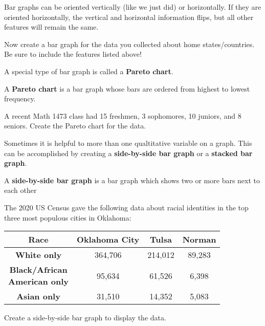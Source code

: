 \documentclass[notes]{subfiles}
\begin{document}
		\begin{rmk}[Note]
			Bar graphs can be oriented vertically (like we just did) or horizontally.  If they are oriented horizontally, the vertical and horizontal information flips, but all other features will remain the same.
		\end{rmk}

		\begin{ex}
			Now create a bar graph for the data you collected about home states/countries.  Be sure to include the features listed above!
		\end{ex}
			\newpage
		A special type of bar graph is called a \textbf{Pareto chart}.

		\begin{defn}
			A \textbf{Pareto chart} is a bar graph whose bars are ordered from highest to lowest frequency.
		\end{defn}

		\begin{ex}
			A recent Math 1473 class had 15 freshmen, 3 sophomores, 10 juniors, and 8 seniors.  Create the Pareto chart for the data.
		\end{ex}

		Sometimes it is helpful to more than one qualtitative variable on a graph.  This can be accomplished by creating a \textbf{side-by-side bar graph} or a \textbf{stacked bar graph}.

		\begin{defn}
			A \textbf{side-by-side bar graph} is a bar graph which shows two or more bars next to each other 
		\end{defn}
		\newpage

		\begin{ex}
			The 2020 US Census gave the following data about racial identities in the top three most populous cities in Oklahoma:
			\begin{center}
				{
				\renewcommand{\arraystretch}{1.5}
				\begin{tabular}{|c|c|c|c|}\hline
					\textbf{Race} & \textbf{Oklahoma City} & \textbf{Tulsa} & \textbf{Norman}\\ \hline
					\textbf{White only} & 364,706 & 214,012 & 89,283 \\ \hline
					\makecell{\textbf{Black/African}\\ \textbf{American only}} & 95,634 & 61,526 & 6,398 \\ \hline
					\textbf{Asian only} & 31,510 & 14,352 & 5,083\\ \hline
				\end{tabular}
				}
			\end{center}
			Create a side-by-side bar graph to display the data.
		\end{ex}
\end{document}
